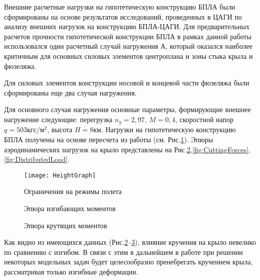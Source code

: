 Внешние расчетные нагрузки на гипотетическую конструкцию БПЛА были сформированы на основе результатов исследований, проведенных в ЦАГИ \cite{BPS_TSAGI} по анализу внешних нагрузок на конструкцию БПЛА-ЦАГИ. Для предварительных расчетов прочности гипотетической конструкции БПЛА в рамках данной работы использовался один расчетный случай нагружения А, который оказался наиболее критичным для основных силовых элементов центроплана и зоны стыка крыла и фюзеляжа. 

Для силовых элементов конструкции носовой и концевой части фюзеляжа были сформированы еще два случая нагружения. 


Для основного случая нагружения основные параметры, формирующие внешнее нагружение следующие: перегрузка $n_y = 2,97$, $M = 0,4$, скоростной напор $q = 503 \text{кгс}/\text{м}^2$, высота $H = 8\text{км}$. Нагрузки на гипотетическую конструкцию БПЛА получены на основе пересчета из работы \cite{BPS}(см. Рис.\ref{fig:ModeOfFlight}). 
Эпюры аэродинамических нагрузок на крыло представлены на Рис.\ref{fig:BendingMoments},\ref{fig:CuttingForces},\ref{fig:DistributedLoad}.



\begin{figure}[H]
\centering
\texttt{[image: HeightGraph]}
\caption{Ограничения на режимы полета}
\label{fig:ModeOfFlight}
\end{figure}


\begin{figure}[H]
\centering
\def\svgwidth{0.9\textwidth}

\caption{Эпюра изгибающих моментов}
\label{fig:BendingMoments}
\end{figure}


%

%

%

\begin{figure}[H]
\centering
\def\svgwidth{0.9\textwidth}

\caption{Эпюра крутящих моментов}
\label{fig:RotatingMoments}
\end{figure}


Как видно из имеющихся данных (Рис.\ref{fig:BendingMoments}--\ref{fig:RotatingMoments}), влияние кручения на крыло невелико по сравнению с изгибом. В связи с этим в дальнейшем в работе при решении некоторых модельных задач будет целесообразно пренебрегать кручением крыла, рассматривая только изгибные деформации. 


